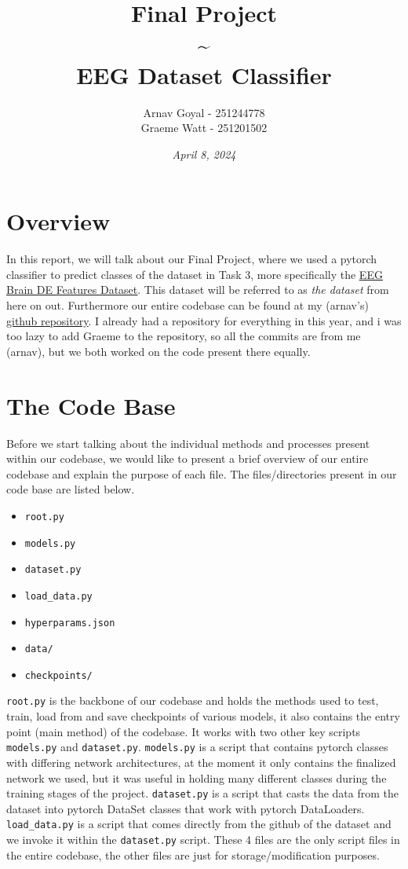 \documentclass[]{report}
\title{Final Project \\ \textasciitilde \\ \textbf{EEG Dataset Classifier}}
\date{\textit{April 8, 2024}}
\author{
	Arnav Goyal - 251244778 \\
	Graeme Watt - 251201502
}
\begin{document}
	
\maketitle

\section*{Overview}

In this report, we will talk about our Final Project, where we used a pytorch classifier to predict classes of the dataset in Task 3, more specifically the \href{https://github.com/PerforMance308/EEG_Dataset}{\underline{EEG Brain DE Features Dataset}}. This dataset will be referred to as \textit{the dataset} from here on out. Furthermore our entire codebase can be found at my (arnav’s) \href{https://github.com/arnav57/university/tree/main/Winter%202023-2024/AISE%203010/Final%20Proj}{\underline{github repository}}. I already had a repository for everything in this year, and i was too lazy to add Graeme to the repository, so all the commits are from me (arnav), but we both worked on the code present there equally.

\section*{The Code Base}

Before we start talking about the individual methods and processes present within our codebase, we would like to present a brief overview of our entire codebase and explain the purpose of each file. The files/directories present in our code base are listed below.

\begin{itemize}[]
	\item \texttt{root.py}
	\item \texttt{models.py}
	\item \texttt{dataset.py}
	\item \texttt{load\_data.py}
	\item \texttt{hyperparams.json}
	\item \texttt{data/}
	\item \texttt{checkpoints/}
\end{itemize}

\texttt{root.py} is the backbone of our codebase and holds the methods used to test, train, load from and save checkpoints of various models, it also contains the entry point (main method) of the codebase. It works with two other key scripts \texttt{models.py} and \texttt{dataset.py}. \texttt{models.py} is a script that contains pytorch classes with differing network architectures, at the moment it only contains the finalized network we used, but it was useful in holding many different classes during the training stages of the project. \texttt{dataset.py} is a script that casts the data from the dataset into pytorch DataSet classes that work with pytorch DataLoaders. \texttt{load\_data.py} is a script that comes directly from the github of the dataset and we invoke it within the \texttt{dataset.py} script. These 4 files are the only script files in the entire codebase, the other files are just for storage/modification purposes.
\end{document}
